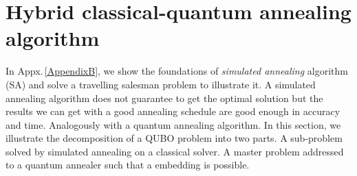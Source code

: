 \section{Hybrid classical-quantum annealing algorithm}
In Appx.\,\ref{AppendixB}, we show the foundations of \textit{simulated annealing} algorithm (SA) and solve a travelling salesman problem to illustrate it. A simulated annealing algorithm does not guarantee to get the optimal solution but the results we can get with a good annealing schedule are good enough in accuracy and time. Analogously with a quantum annealing algorithm. In this section, we illustrate the decomposition of a QUBO problem into two parts. A sub-problem solved by simulated annealing on a classical solver. A master problem addressed to a quantum annealer such that a embedding is possible.

